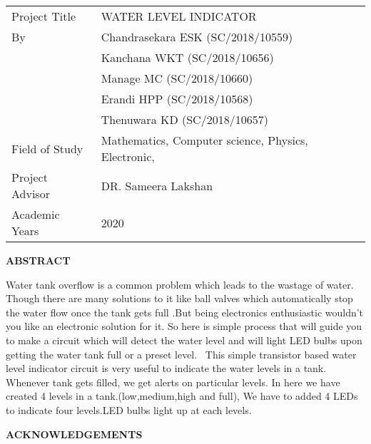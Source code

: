 \documentclass[12pt,a4paper,oneside]{book}
\theoremstyle{plain}
\numberwithin{equation}{chapter} \DeclareMathOperator{\Var}{Var}
\begin{document}
\newpage
{}
\begin{table}[h]
	\begin{tabular}{ll}
		Project Title								   & WATER LEVEL INDICATOR  \\
										 				
		By							   					  & Chandrasekara ESK (SC/2018/10559) \\
															& Kanchana WKT (SC/2018/10656)  \\
															& Manage MC (SC/2018/10660) \\ 
															& Erandi HPP (SC/2018/10568) \\
															& Thenuwara KD  (SC/2018/10657) \\
		Field of Study			  					 & Mathematics, Computer science, Physics, Electronic,

\\
		Project Advisor								& DR. Sameera Lakshan \\
															
		Academic Years							  & 2020 \\
	\end{tabular}
\end{table}
\begin{center}
  \large{\textbf{ABSTRACT}}\\
\end{center}

Water tank overflow is a common problem which leads to the wastage of water. Though there are many solutions to it like ball valves which automatically stop the water flow once the tank gets full .But being electronics enthusiastic wouldn't you like an electronic solution for it. So here is simple process that will guide you to make a circuit which will detect the water level and will light LED bulbs upon getting the water tank full or a preset  level.
\
This simple transistor based water level indicator circuit is very useful to indicate the water levels in a tank. Whenever tank gets filled, we get alerts on particular levels. In here we have created 4 levels in a tank.(low,medium,high and full), We have to added 4 LEDs to indicate four levels.LED bulbs light up at each levels. 



\newpage
\begin{center}
	\large{\textbf{ACKNOWLEDGEMENTS}} \\
\end{center}
\end{document}
